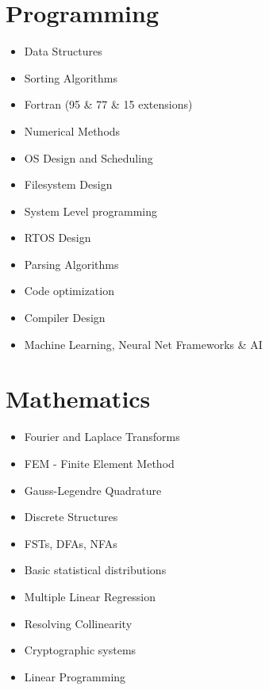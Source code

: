 \documentclass[a4paper]{article}
\begin{document}
\section{Programming}
\begin{itemize}
\item Data Structures
\item Sorting Algorithms
\item Fortran (95 \& 77 \& 15 extensions)
\item Numerical Methods
\item OS Design and Scheduling
\item Filesystem Design
\item System Level programming
\item RTOS Design
\item Parsing Algorithms
\item Code optimization
\item Compiler Design
\item Machine Learning, Neural Net Frameworks \& AI
\end{itemize}

\section{Mathematics}
\begin{itemize}
\item Fourier and Laplace Transforms
\item FEM - Finite Element Method
\item Gauss-Legendre Quadrature
\item Discrete Structures
\item FSTs, DFAs, NFAs
\item Basic statistical distributions
\item Multiple Linear Regression
\item Resolving Collinearity
\item Cryptographic systems
\item Linear Programming
\end{itemize}

\end{document}

